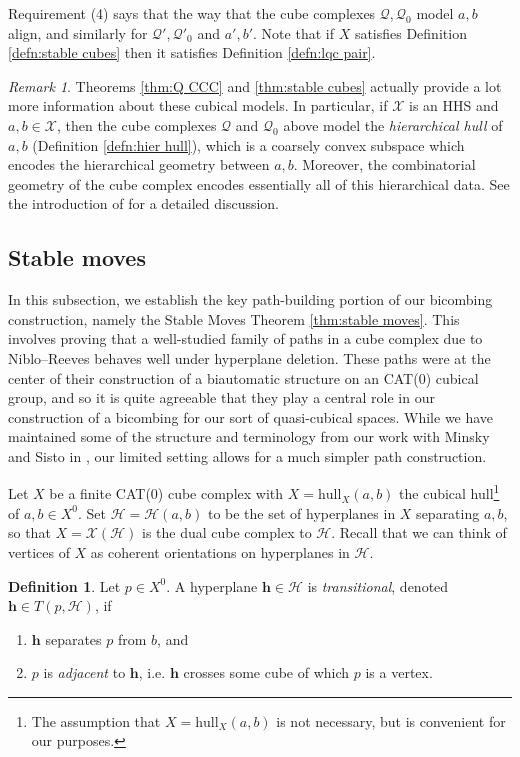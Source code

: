 \documentclass{amsart}
\theoremstyle{definition}
\newtheorem{definition}[theorem]{Definition}
\theoremstyle{remark}
\newtheorem{remark}[theorem]{Remark}
\theoremstyle{definition}
\newcommand{\hh}{{\sf h}}
\newcommand{\calH}{\mathcal{H}}
\newcommand{\calQ}{\mathcal{Q}}
\newcommand{\calX}{\mathcal{X}}
\renewcommand{\hh}{\mathbf{h}}
\newcommand{\hull}{\mathrm{hull}}
\begin{document}
Requirement (4) says that the way that the cube complexes $\calQ,\calQ_0$ model $a,b$ align, and similarly for $\calQ', \calQ'_0$ and $a',b'$.  Note that if $X$ satisfies Definition \ref{defn:stable cubes} then it satisfies Definition \ref{defn:lqc pair}.  

\begin{remark}
Theorems \ref{thm:Q CCC} and \ref{thm:stable cubes} actually provide a lot more information about these cubical models.  In particular, if $\calX$ is an HHS and $a,b \in \calX$, then the cube complexes $\calQ$ and $\calQ_0$ above model the \emph{hierarchical hull} of $a,b$ (Definition \ref{defn:hier hull}), which is a coarsely convex subspace which encodes the hierarchical geometry between $a,b$.  Moreover, the combinatorial geometry of the cube complex encodes essentially all of this hierarchical data.  See the introduction of \cite{Dur_infcube} for a detailed discussion.
\end{remark}

\subsection{Stable moves}\label{sec:NR stability}

In this subsection, we establish the key path-building portion of our bicombing construction, namely the Stable Moves Theorem \ref{thm:stable moves}.  This involves proving that a well-studied family of paths in a cube complex due to Niblo--Reeves \cite{NibloReeves} behaves well under hyperplane deletion.  These paths were at the center of their construction of a biautomatic structure on an CAT(0) cubical group, and so it is quite agreeable that they play a central role in our construction of a bicombing for our sort of quasi-cubical spaces.  While we have maintained some of the structure and terminology from our work with Minsky and Sisto in \cite[Section 5]{DMS_bary}, our limited setting allows for a much simpler path construction.

Let $X$ be a finite CAT(0) cube complex with $X = \hull_X(a,b)$ the cubical hull\footnote{The  assumption that $X = \hull_X(a,b)$ is not necessary, but is convenient for our purposes.} of $a,b \in X^0$.  Set $\calH = \calH(a,b)$ to be the set of hyperplanes in $X$ separating $a,b$, so that $X = \calX(\calH)$ is the dual cube complex to $\calH$.  Recall that we can think of vertices of $X$ as coherent orientations on hyperplanes in $\calH$.

\begin{definition}
Let $p \in X^0$.  A hyperplane $\hh \in \calH$ is \emph{transitional}, denoted $\hh \in T(p,\calH)$, if
\begin{enumerate}
\item $\hh$ separates $p$ from $b$, and
\item $p$ is \emph{adjacent} to $\hh$, i.e. $\hh$ crosses some cube of which $p$ is a vertex.
\end{enumerate}
\end{definition}
\end{document}
